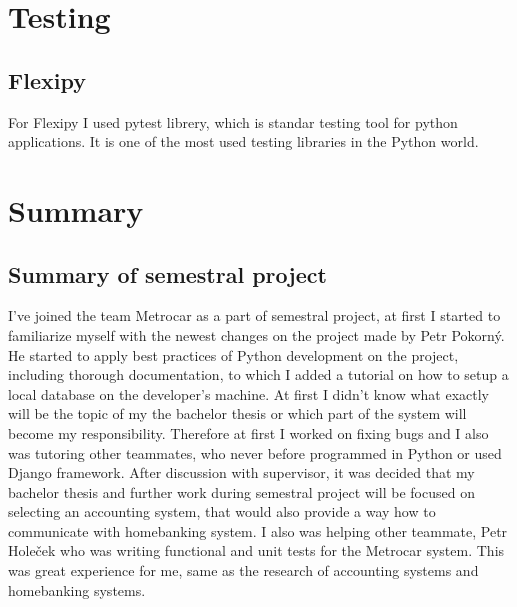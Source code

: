 \documentclass[11pt,twoside,a4paper]{book}
\begin{document}
\chapter{Testing}
\section{Flexipy}
For Flexipy I used pytest librery, which is standar testing tool for python applications. It is one of the most used testing libraries in the Python world. 

\chapter{Summary}
\section{Summary of semestral project}
I've joined the team Metrocar as a part of semestral project, at first I started to familiarize myself with the newest 
changes on the project made by Petr Pokorný. He started to apply best practices of Python development on the project, including thorough documentation, to which I added a tutorial on how to setup a local database on the developer's machine. At first I didn't know what exactly will be the topic of my the bachelor thesis or which part of the system will become my responsibility. Therefore at first I worked on fixing bugs and I also was tutoring other teammates, who never before programmed in Python or used Django framework. After discussion with supervisor, it was decided that my bachelor thesis and further work during semestral project will be focused on selecting an accounting system, that would also provide a way how to communicate with homebanking system. I also was helping other teammate, Petr Holeček who was writing functional and unit tests for the Metrocar system. This was great experience for me, same as the research of accounting systems and homebanking systems. 

 

\end{document}
